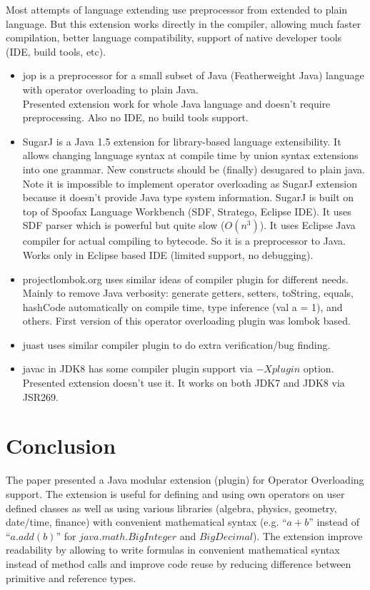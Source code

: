 \documentclass{aircc}
\begin{document}
Most attempts of language extending use preprocessor from extended to plain language.
But this extension works directly in the compiler, 
allowing much faster compilation, better language compatibility,
support of native developer tools (IDE, build tools, etc).

\begin{itemize}
\item jop\cite{jop}
is a preprocessor for a small subset of Java (Featherweight Java) language with operator overloading to plain Java. \\
Presented extension work for whole Java language and doesn't require preprocessing.
Also no IDE, no build tools support.
\item SugarJ\cite{sugarj}
is a Java 1.5 extension for library-based language extensibility. 
It allows changing language syntax at compile time by union syntax extensions into one grammar.
New constructs should be (finally) desugared to plain java.
Note it is impossible to implement operator overloading as SugarJ extension because it doesn't provide Java type system information.
SugarJ is built on top of Spoofax Language Workbench (SDF, Stratego, Eclipse IDE).
It uses SDF parser which is powerful but quite slow ($O(n^3)$).
It uses Eclipse Java compiler for actual compiling to bytecode. So it is a preprocessor to Java.
Works only in Eclipse based IDE (limited support, no debugging).
\item projectlombok.org uses similar ideas of compiler plugin for different needs. 
Mainly to remove Java verbosity:
generate getters, setters, toString, equals, hashCode automatically on compile time, 
type inference (val a = 1), and others.
First version of this operator overloading plugin was lombok based\cite{lombok-oo}.
\item juast\cite{juast} uses similar compiler plugin to do extra verification/bug finding.
\item javac in JDK8 has some compiler plugin support via $-Xplugin$ option\cite{Xplugin}.
Presented extension doesn't use it. It works on both JDK7 and JDK8 via JSR269.
\end{itemize}

\section{Conclusion}
The paper presented a Java modular extension (plugin) for
Operator Overloading support. 
The extension is useful for
 defining and using own operators on user defined classes
 as well as using various libraries (algebra, physics, geometry, date/time, finance) 
  with convenient mathematical syntax
  (e.g. ``$a + b$'' instead of ``$a.add(b)$'' for $java.math.BigInteger$ and $BigDecimal$).
The extension improve readability by allowing to write formulas in convenient mathematical syntax
instead of method calls and improve code reuse by reducing difference between primitive and reference types.
\end{document}
